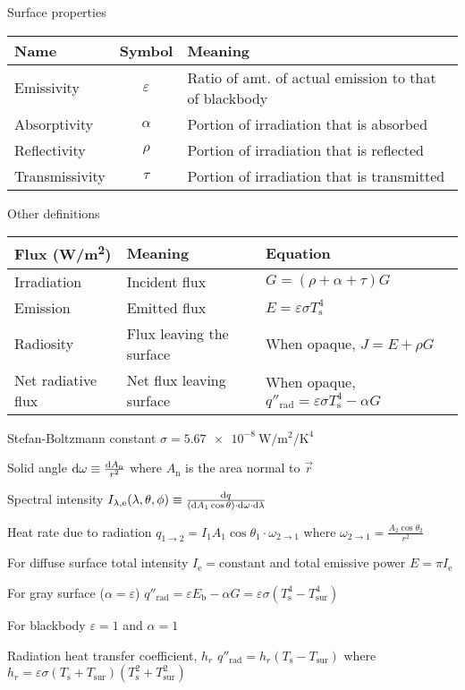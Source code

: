 \documentclass{article}
\begin{document}
\begin{description*}
  \item[Surface properties]
    \begin{tabu}{lcl}
      \toprule
      Name & Symbol & Meaning \\
      \midrule
      Emissivity & $\varepsilon$ & Ratio of amt. of actual emission to that of blackbody \\
      Absorptivity & $\alpha$ & Portion of irradiation that is absorbed \\
      Reflectivity & $\rho$ & Portion of irradiation that is reflected \\
      Transmissivity & $\tau$ & Portion of irradiation that is transmitted \\
      \bottomrule
    \end{tabu}
  \item[Other definitions]
    \begin{tabu}{lll}
      \toprule
      Flux (\si[per-mode=symbol]{\watt\per\square\meter}) & Meaning & Equation \\
      \midrule
      Irradiation & Incident flux & \(G = (\rho+\alpha+\tau)G\) \\
      Emission & Emitted flux & \(E = \varepsilon\sigma{}T^4_\mathrm{s}\) \\
      Radiosity & Flux leaving the surface & When opaque, \(J = E + \rho{}G\)\\
      Net radiative flux & Net flux leaving surface & When opaque,
      \(q''_\mathrm{rad} = \varepsilon\sigma{}T^4_\mathrm{s}-\alpha{}G\) \\
      \bottomrule
    \end{tabu}
  \item[Stefan-Boltzmann constant]
    \(\sigma = \SI{5.67e-8}{\watt\per\square\meter\per\kelvin\tothe{4}}\)
  \item[Solid angle]
    \(\dif{\omega} \equiv \frac{\dif{A_\mathrm{n}}}{r^2}\) where
    $A_\mathrm{n}$ is the area normal to $\vec{r}$
  \item[Spectral intensity]
    \(I_{\lambda,\mathrm{e}}(\lambda,\theta,\phi)
    \equiv \frac{\dif q}{(\dif{A_1}\cos\theta)\cdot\dif{\omega}\cdot\dif{\lambda}}\)
  \item[Heat rate due to radiation]
    \(q_{1\rightarrow2} = I_1A_1\cos\theta_1 \cdot \omega_{2\rightarrow1}\) where
    \(\omega_{2\rightarrow1} = \frac{A_2\cos\theta_2}{r^2}\)
  \item[For diffuse surface]
    total intensity \(I_\mathrm{e} = \textrm{constant}\) and
    total emissive power \(E = \pi{}I_\mathrm{e}\)
  \item[For gray surface ($\alpha=\varepsilon$)]
    \(q''_\mathrm{rad} = \varepsilon E_\mathrm{b} - \alpha G
    = \varepsilon\sigma(T_\mathrm{s}^4-T_\mathrm{sur}^4)\)
  \item[For blackbody] $\varepsilon=1$ and $\alpha=1$
  \item[Radiation heat transfer coefficient, $h_r$]
    \(q''_\mathrm{rad} = h_r(T_\mathrm{s}-T_\mathrm{sur})\) where
    \(h_r = \varepsilon\sigma(T_\mathrm{s}+T_\mathrm{sur})(T_\mathrm{s}^2+T_\mathrm{sur}^2)\)
\end{description*}
\end{document}

